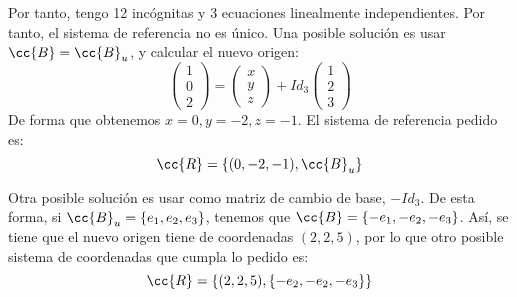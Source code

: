 \begin{ejercicio}
    Por tanto, tengo 12 incógnitas y 3 ecuaciones linealmente independientes. Por tanto, el sistema de referencia no es único. Una posible solución es usar $\cc{B}=\cc{B}_u$, y calcular el nuevo origen:
    \begin{equation*}
        \left(\begin{array}{c}
            1 \\ 0 \\ 2
        \end{array}\right) = 
        \left(\begin{array}{c}
            x \\ y \\ z
        \end{array}\right) + Id_3
        \left(\begin{array}{c}
            1 \\ 2 \\ 3
        \end{array}\right)
    \end{equation*}
    De forma que obtenemos $x=0, y=-2, z=-1$. El sistema de referencia pedido es:
    \begin{equation*}
        \cc{R}=\{(0, -2, -1),\cc{B}_u\}
    \end{equation*}

    Otra posible solución es usar como matriz de cambio de base, $-Id_3$. De esta forma, si $\cc{B}_u=\{e_1,e_2,e_3\}$, tenemos que $\cc{B}=\{-e_1,-e_2,-e_3\}$. Así, se tiene que el nuevo origen tiene de coordenadas $(2, 2, 5)$, por lo que otro posible sistema de coordenadas que cumpla lo pedido es:
    \begin{equation*}
        \cc{R}=\{(2,2,5),\{-e_2,-e_2,-e_3\}\}
    \end{equation*}
\end{ejercicio}


